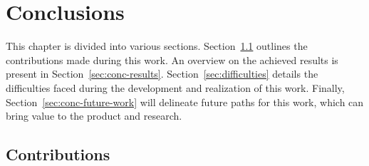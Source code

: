 \chapter{Conclusions} \label{chap:concl}


This chapter is divided into various sections. Section~\ref{sec:conc-contributions} outlines the contributions made during this work. An overview on the achieved results is present in Section~\ref{sec:conc-results}. Section~\ref{sec:difficulties} details the difficulties faced during the development and realization of this work. Finally, Section~\ref{sec:conc-future-work} will delineate future paths for this work, which can bring value to the product and research.

\section{Contributions} \label{sec:conc-contributions}

